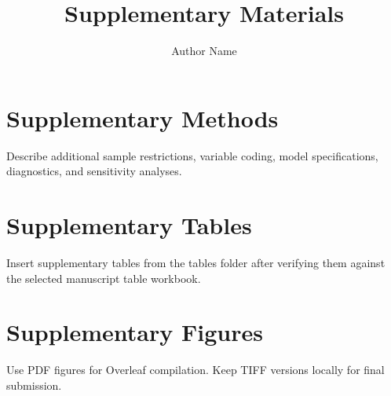 \documentclass[12pt]{article}
\title{Supplementary Materials}
\author{Author Name}
\date{}
\begin{document}
\maketitle

\section{Supplementary Methods}

Describe additional sample restrictions, variable coding, model specifications, diagnostics, and sensitivity analyses.

\section{Supplementary Tables}

Insert supplementary tables from the tables folder after verifying them against the selected manuscript table workbook.

\section{Supplementary Figures}

Use PDF figures for Overleaf compilation. Keep TIFF versions locally for final submission.



\end{document}
